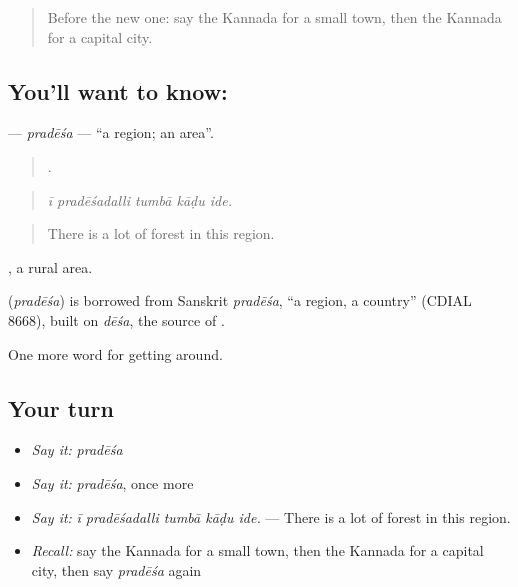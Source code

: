 \label{lesson:KA-C465-pradesa}



\begin{quote}
Before the new one: say the Kannada for a small town, then the Kannada for a capital city.
\end{quote}

\subsection*{You'll want to know: }
\textbf{} — \emph{pradēśa} — \textquotedblleft{}a region; an area\textquotedblright{}.

\begin{quote}
    .
\end{quote}

\begin{quote}
\emph{ī pradēśadalli tumbā kāḍu ide.}
\end{quote}

\begin{quote}
There is a lot of forest in this region.
\end{quote}

 , a rural area.

\begin{cousinweb}
\textbf{} (\emph{pradēśa}) is borrowed from Sanskrit \emph{pradēśa}, \textquotedblleft{}a region, a country\textquotedblright{} (CDIAL 8668), built on \emph{dēśa}, the source of .
\end{cousinweb}

\begin{grammarlens}[title={What you've built}]
One more word for getting around.
\end{grammarlens}

\subsection*{Your turn}
\begin{itemize}
\raggedright
  \item \emph{Say it:} \emph{pradēśa}
  \item \emph{Say it:} \emph{pradēśa}, once more
  \item \emph{Say it:} \emph{ī pradēśadalli tumbā kāḍu ide.} — There is a lot of forest in this region.
  \item \emph{Recall:} say the Kannada for a small town, then the Kannada for a capital city, then say \emph{pradēśa} again
\end{itemize}

